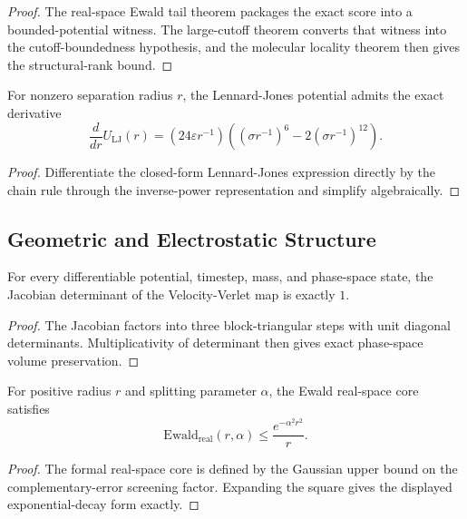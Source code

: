 \begin{proof}
The real-space Ewald tail theorem packages the exact score into a bounded-potential witness. The large-cutoff theorem converts that witness into the cutoff-boundedness hypothesis, and the molecular locality theorem then gives the structural-rank bound.
\end{proof}

\begin{theorem}\label{thm:lj-gradient}
For nonzero separation radius $r$, the Lennard-Jones potential admits the exact derivative
\[
\frac{d}{dr}U_{\mathrm{LJ}}(r)
=
\left(24\varepsilon r^{-1}\right)
\left((\sigma r^{-1})^6 - 2(\sigma r^{-1})^{12}\right).
\]
\end{theorem}

\begin{proof}
Differentiate the closed-form Lennard-Jones expression directly by the chain rule through the inverse-power representation and simplify algebraically.
\end{proof}

\subsection{Geometric and Electrostatic Structure}

\begin{theorem}\label{thm:velocity-verlet-volume}
For every differentiable potential, timestep, mass, and phase-space state, the Jacobian determinant of the Velocity-Verlet map is exactly $1$.
\end{theorem}

\begin{proof}
The Jacobian factors into three block-triangular steps with unit diagonal determinants. Multiplicativity of determinant then gives exact phase-space volume preservation.
\end{proof}

\begin{theorem}\label{thm:ewald-real-space-decay}
For positive radius $r$ and splitting parameter $\alpha$, the Ewald real-space core satisfies
\[
\mathrm{Ewald}_{\mathrm{real}}(r,\alpha)
\le
\frac{e^{-\alpha^2 r^2}}{r}.
\]
\end{theorem}

\begin{proof}
The formal real-space core is defined by the Gaussian upper bound on the complementary-error screening factor. Expanding the square gives the displayed exponential-decay form exactly.
\end{proof}

